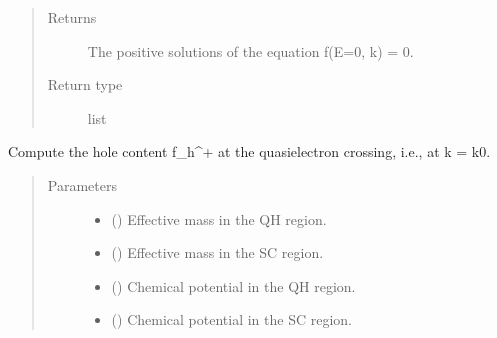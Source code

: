\documentclass[letterpaper,10pt,english]{sphinxmanual}
\begin{document}
\begin{fulllineitems}
\begin{quote}
\begin{description}
\begin{itemize}
\end{itemize}

\item[{Returns}] \leavevmode
\sphinxAtStartPar
The positive solutions of the equation f(E=0, k) = 0.

\item[{Return type}] \leavevmode
\sphinxAtStartPar
list

\end{description}\end{quote}

\end{fulllineitems}


\begin{fulllineitems}
\label{\detokenize{modules:modules.functions.hole_probability}}
\pysigstartsignatures
{}
\pysigstopsignatures
\sphinxAtStartPar
Compute the hole content f\_h\textasciicircum{}+ at the quasi\sphinxhyphen{}electron crossing, i.e., at k = \sphinxhyphen{}k0.
\begin{quote}\begin{description}
\item[{Parameters}] \leavevmode\begin{itemize}
\item {} 
\sphinxAtStartPar
{} () \textendash{} Effective mass in the QH region.

\item {} 
\sphinxAtStartPar
{} () \textendash{} Effective mass in the SC region.

\item {} 
\sphinxAtStartPar
{} () \textendash{} Chemical potential in the QH region.

\item {} 
\sphinxAtStartPar
{} () \textendash{} Chemical potential in the SC region.


\end{itemize}
\end{description}
\end{quote}
\end{fulllineitems}
\end{document}
